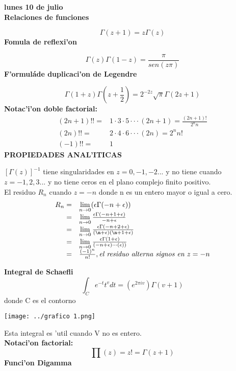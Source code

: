 \documentclass{article}
\theoremstyle{definition}
\begin{document}
\textbf{lunes 10 de julio}\\
\textbf{Relaciones de funciones}

\[\Gamma (z+1) = z\Gamma (z)\]
\textbf{Fomula de reflexi'on}

\[\Gamma (z)\Gamma (1-z) = \frac{\pi}{sen(z\pi)}\]
\textbf{F'ormuláde duplicaci'on de Legendre}

\[\Gamma (1+z)\Gamma (z+\frac{1}{2}) = 2^{-2z}\sqrt{\pi}\Gamma (2z+1) \]
\textbf{Notac'i'on doble factorial: }
\[
\begin{array}{rl}
	(2n+1)!!=& 1\cdot 3\cdot 5\cdot\cdot\cdot (2n+1)=\frac{(2n+1)!}{2^nn}\\
	(2n)!!=& 2\cdot 4\cdot 6\cdot\cdot\cdot (2n)=2^nn!\\
	(-1)!!=& 1
\end{array}
\]
\textbf{PROPIEDADES ANAL'ITICAS}

$[\Gamma (z)]^{-1}$ tiene singularidades en $z=0,-1,-2...$ y no tiene cuando  $z=-1,2,3...$ y no tiene ceros en el plano complejo finito positivo.\\
El residuo $R_n$ cuando $z=-n$ donde n es un entero mayor o igual a cero.\\
\[
\begin{array}{rl}
	R_n=&\lim\limits_{n\to 0} (\epsilon\Gamma (-n+\epsilon))\\
	=& \lim\limits_{n\to 0} \frac{\epsilon\Gamma (-n+1+\epsilon)}{-n+\epsilon}\\
	=& \lim\limits_{n\to 0}\frac{\epsilon\Gamma (-n+2+\epsilon)}{(\n+\epsilon)(\n+1+\epsilon)}\\
	=&\lim\limits_{n\to 0} \frac{\epsilon\Gamma (1+\epsilon)}{(-n+\epsilon)\cdot\cdot\cdot(\epsilon))}\\
	=& \frac{(-1)^n}{n!}, \textit{el residuo alterna signos en } z=-n
\end{array}
\]

\textbf{Integral de Schaefli}
\[\int_Ce^{-t}t^vdt=(e^{2\pi iv})\Gamma (v+1)\]
donde C es el contorno
\begin{center}
\texttt{[image: ../grafico 1.png]} 
\end{center}

Esta integral es 'util cuando V no es entero.\\
\textbf{Notaci'on factorial:}
\[\prod (z)=z!=\Gamma (z+1)\]
\textbf{Funci'on Digamma}
\end{document}
